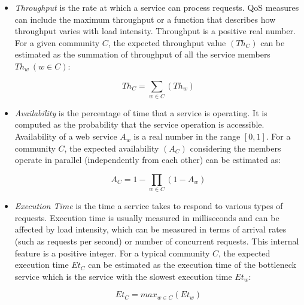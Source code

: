 \documentclass[11pt,onecolumn]{IEEEtran}
\begin{document}
\begin{itemize}

  \item \emph{Throughput} is the rate at which a service can process requests. QoS measures can include the maximum throughput or a function that describes how throughput varies with load intensity. Throughput is a positive real number. For a given community $C$, the expected throughput value $(Th_{C})$ can be estimated as the summation of throughput of all the service members $Th_{w}~ (w \in C)$:
	
	\begin{equation}
		 Th_{C} = \sum_{w \in C}{(Th_{w})}
	\end{equation}
	
	\item \emph{Availability} is the percentage of time that a service is operating. It is computed as
the probability that the service operation is accessible. Availability of a web service $A_w$ is a real number in the range $[0, 1]$. For a community $C$, the expected availability $(A_{C})$ considering the members operate in parallel (independently from each other) can be estimated as:
	
	\begin{equation}
		A_{C} = 1-\prod_{w \in C}{(1-A_{w})} 
	\end{equation}
	
	\item \emph{Execution Time} is the time a service takes to respond to various types of requests. 
	Execution time is usually measured in milliseconds and can be affected by load intensity, which can be measured in terms of arrival rates (such as requests per second) or number of concurrent requests. This internal feature is a positive integer. For a typical community $C$, the expected execution time $Et_{C}$ can be estimated as the execution time of the bottleneck service which is the service with the slowest execution time $Et_{w}$:
	
	\begin{equation}
		Et_{C} = max_{w \in C}{(Et_{w})}
	\end{equation}
	
\end{itemize}
\end{document}

